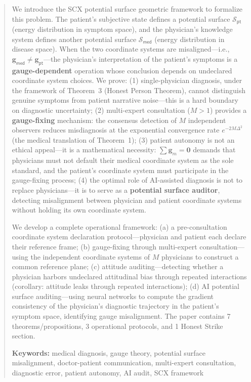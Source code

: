 \documentclass[12pt,a4paper]{article}
\theoremstyle{remark}
\newcommand{\med}{\textsf{med}}
\newcommand{\pt}{\textsf{pt}}
\begin{document}
\begin{abstract}
We introduce the SCX potential surface geometric framework to formalize this problem. The patient's subjective state defines a potential surface $\mathcal{S}_{\pt}$ (energy distribution in symptom space), and the physician's knowledge system defines another potential surface $\mathcal{S}_{\med}$ (energy distribution in disease space). When the two coordinate systems are misaligned---i.e., $\mathbf{g}_{\med} \neq \mathbf{g}_{\pt}$---the physician's interpretation of the patient's symptoms is a \textbf{gauge-dependent} operation whose conclusion depends on undeclared coordinate system choices. We prove: (1) single-physician diagnosis, under the framework of Theorem~3 (Honest Person Theorem), cannot distinguish genuine symptoms from patient narrative noise---this is a hard boundary on diagnostic uncertainty; (2) multi-expert consultation ($M > 1$) provides a \textbf{gauge-fixing} mechanism: the consensus detection of $M$ independent observers reduces misdiagnosis at the exponential convergence rate $e^{-2M\Delta^2}$ (the medical translation of Theorem~1); (3) patient autonomy is not an ethical appeal---it is a mathematical necessity: $\sum \mathbf{g}_m = \mathbf{0}$ demands that physicians must not default their medical coordinate system as the sole standard, and the patient's coordinate system must participate in the gauge-fixing process; (4) the optimal role of AI-assisted diagnosis is not to replace physicians---it is to serve as a \textbf{potential surface auditor}, detecting misalignment between physician and patient coordinate systems without holding its own coordinate system.

We develop a complete operational framework: (a) a pre-consultation coordinate system declaration protocol---physician and patient each declare their reference frame; (b) gauge-fixing through multi-expert consultation---using the independent coordinate systems of $M$ physicians to construct a common reference plane; (c) attitude auditing---detecting whether a physician harbors undeclared attitudinal bias through repeated interactions (corollary: attitude leaks through repeated interactions); (d) AI potential surface auditing---using neural networks to compute the gradient consistency of the physician's diagnostic trajectory in the patient's symptom space, identifying gauge misalignment. The paper contains 7 theorems/propositions, 3 operational protocols, and 1 Honest Strike section.

\vspace{4pt}
\noindent\textbf{Keywords:} medical diagnosis, gauge theory, potential surface misalignment, doctor-patient communication, multi-expert consultation, diagnostic error, patient autonomy, AI audit, SCX framework

\end{abstract}
\end{document}
